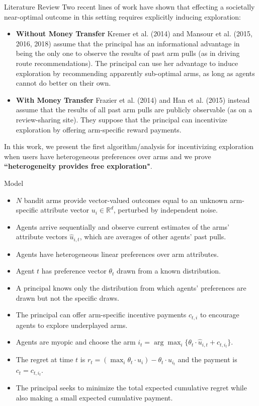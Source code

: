 \documentclass[final]{beamer}
\newlength{\onecolwid}
\begin{document}
\begin{frame}[t]
\begin{columns}[t]
\begin{column}{\onecolwid}
\begin{block}{Literature Review}
Two recent lines of work have shown that effecting a societally near-optimal outcome in this setting requires explicitly inducing exploration:
\begin{itemize}
\item \textbf{Without Money Transfer} Kremer et al. (2014) and Mansour et al. (2015, 2016, 2018) assume that the principal has an informational advantage in being the only one to observe the results of past arm pulls (as in driving route recommendations). The principal can use her advantage to induce exploration by recommending apparently sub-optimal arms, as long as agents cannot do better on their own.
\item \textbf{With Money Transfer} Frazier et al. (2014) and Han et al. (2015) instead assume that the results of all past arm pulls are publicly observable (as on a review-sharing site). They suppose that the principal can incentivize exploration by offering arm-specific reward payments.
\end{itemize}
In this work, we present the first algorithm/analysis for incentivizing exploration when users have heterogeneous preferences over arms and we prove \textbf{“heterogeneity provides free exploration"}.
\end{block}

\begin{block}{Model}
\begin{itemize}
\item $N$ bandit arms provide vector-valued outcomes equal to an unknown arm-specific attribute vector $u_{i}\in \mathbb{R}^{d}$, perturbed by independent noise. 
\item Agents arrive sequentially and observe current estimates of the arms’ attribute vectors $\hat{u}_{i,t}$, which are averages of other agents’ past pulls. 
\item Agents have heterogeneous linear preferences over arm attributes.
\item Agent $t$ has preference vector $\theta_t$ drawn from a known distribution.
\item A principal knows only the distribution from which agents’ preferences are drawn but not the specific draws.
\item The principal can offer arm-specific incentive payments $c_{t,i}$ to encourage agents to explore underplayed arms. 
\item Agents are myopic and choose the arm $i_t = \arg\max_{i}\{\theta_{t}\cdot \hat{u}_{i,t} + c_{t,i_t}\}$.
\item The regret at time $t$ is $r_t = (\max_{i} \theta_t \cdot u_i) - \theta_t \cdot u_{i_t}$ and the payment is $c_t = c_{t,i_t}$.
\item The principal seeks to minimize the total expected cumulative regret while also making a small expected cumulative payment.
\end{itemize}
\end{block}


\end{column}
\end{columns}
\end{frame}
\end{document}
